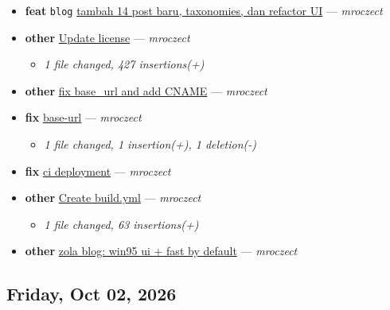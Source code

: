 \begin{itemize}[leftmargin=1.5em]
  \item \textbf{feat} \texttt{blog} \href{https://github.com/mroczect/mroczect.github.io/commit/2f3b471ed990f7b94d5848d987357ed4084e283a}{tambah 14 post baru, taxonomies, dan refactor UI} --- \textit{mroczect}
  \item \textbf{other} \href{https://github.com/mroczect/mroczect.github.io/commit/a2f68e8e6b8ad45aa354e1df75bb7870c09e50ed}{Update license} --- \textit{mroczect}
  \begin{itemize}[leftmargin=1.5em]
    \item \small\textit{1 file changed, 427 insertions(+)}
  \end{itemize}
  \item \textbf{other} \href{https://github.com/mroczect/mroczect.github.io/commit/1d9a816c19d331d11b12c3b5fcf0742eea87b4c6}{fix base\_url and add CNAME} --- \textit{mroczect}
  \item \textbf{fix} \href{https://github.com/mroczect/mroczect.github.io/commit/f1b85e334b1242cdcca140f9965b8b431245a333}{base-url} --- \textit{mroczect}
  \begin{itemize}[leftmargin=1.5em]
    \item \small\textit{1 file changed, 1 insertion(+), 1 deletion(-)}
  \end{itemize}
  \item \textbf{fix} \href{https://github.com/mroczect/mroczect.github.io/commit/955ca04fc580896f1b379b3bdfeeec76ccf64e71}{ci deployment} --- \textit{mroczect}
  \item \textbf{other} \href{https://github.com/mroczect/mroczect.github.io/commit/6cc4759a86962f4e4c6f6fd17705288d77661c08}{Create build.yml} --- \textit{mroczect}
  \begin{itemize}[leftmargin=1.5em]
    \item \small\textit{1 file changed, 63 insertions(+)}
  \end{itemize}
  \item \textbf{other} \href{https://github.com/mroczect/mroczect.github.io/commit/3f6445d1cfe1565c00444385823b1c0fa06acce5}{zola blog: win95 ui + fast by default} --- \textit{mroczect}
\end{itemize}

\subsection*{Friday, Oct 02, 2026}

